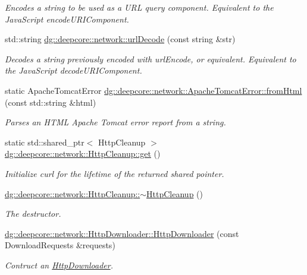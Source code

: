 \begin{DoxyCompactItemize}
\begin{DoxyCompactList}\small\item\em Encodes a string to be used as a U\+RL query component. Equivalent to the Java\+Script encode\+U\+R\+I\+Component. \end{DoxyCompactList}\item 
std\+::string \hyperlink{group___network_module_gae91a77df82de63d6bce7940e22d5db0e}{dg\+::deepcore\+::network\+::url\+Decode} (const string \&str)
\begin{DoxyCompactList}\small\item\em Decodes a string previously encoded with url\+Encode, or equivalent. Equivalent to the Java\+Script decode\+U\+R\+I\+Component. \end{DoxyCompactList}\item 
static Apache\+Tomcat\+Error \hyperlink{group___network_module_ga84792c450664512e6891ecccbb205944}{dg\+::deepcore\+::network\+::\+Apache\+Tomcat\+Error\+::from\+Html} (const std\+::string \&html)
\begin{DoxyCompactList}\small\item\em Parses an H\+T\+ML Apache Tomcat error report from a string. \end{DoxyCompactList}\item 
static std\+::shared\+\_\+ptr$<$ Http\+Cleanup $>$ \hyperlink{group___network_module_ga039c8cd2070cc244714a28bdeddab074}{dg\+::deepcore\+::network\+::\+Http\+Cleanup\+::get} ()
\begin{DoxyCompactList}\small\item\em Initialize curl for the lifetime of the returned shared pointer. \end{DoxyCompactList}\item 
\hyperlink{group___network_module_gac517b1ec291e0fdcef96e8e7af54eb1d}{dg\+::deepcore\+::network\+::\+Http\+Cleanup\+::$\sim$\+Http\+Cleanup} ()
\begin{DoxyCompactList}\small\item\em The destructor. \end{DoxyCompactList}\item 
\hyperlink{group___network_module_gaee68926e47a7a8e18926b25a274a6741}{dg\+::deepcore\+::network\+::\+Http\+Downloader\+::\+Http\+Downloader} (const Download\+Requests \&requests)
\begin{DoxyCompactList}\small\item\em Contruct an \hyperlink{classdg_1_1deepcore_1_1network_1_1_http_downloader}{Http\+Downloader}. \end{DoxyCompactList}\item 

\end{DoxyCompactItemize}
